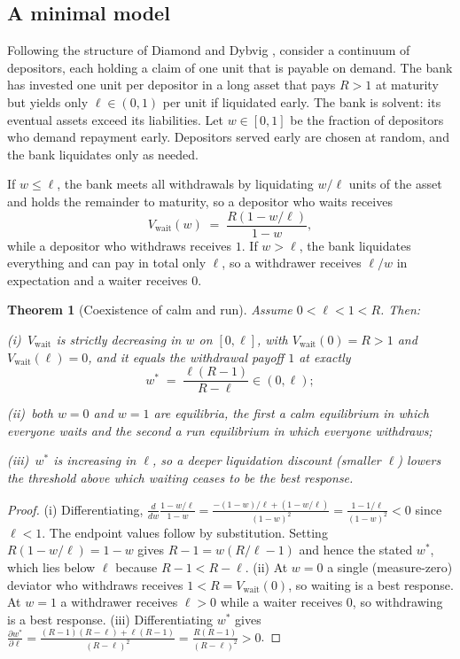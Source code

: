 \documentclass[11pt]{article}
\newtheorem{theorem}{Theorem}[section]
\theoremstyle{definition}
\theoremstyle{remark}
\begin{document}
\subsection{A minimal model}

Following the structure of Diamond and Dybvig \cite{diamond1983}, consider a continuum of depositors, each holding a claim of one unit that is payable on demand. The bank has invested one unit per depositor in a long asset that pays $R>1$ at maturity but yields only $\ell\in(0,1)$ per unit if liquidated early. The bank is solvent: its eventual assets exceed its liabilities. Let $w\in[0,1]$ be the fraction of depositors who demand repayment early. Depositors served early are chosen at random, and the bank liquidates only as needed.

If $w\le\ell$, the bank meets all withdrawals by liquidating $w/\ell$ units of the asset and holds the remainder to maturity, so a depositor who waits receives
\[
V_{\mathrm{wait}}(w)\;=\;\frac{R(1-w/\ell)}{1-w},
\]
while a depositor who withdraws receives $1$. If $w>\ell$, the bank liquidates everything and can pay in total only $\ell$, so a withdrawer receives $\ell/w$ in expectation and a waiter receives $0$.

\begin{theorem}[Coexistence of calm and run]\label{thm:run}
Assume $0<\ell<1<R$. Then:
\par\smallskip\noindent(i)~$V_{\mathrm{wait}}$ is strictly decreasing in $w$ on $[0,\ell]$, with $V_{\mathrm{wait}}(0)=R>1$ and $V_{\mathrm{wait}}(\ell)=0$, and it equals the withdrawal payoff $1$ at exactly
\[
w^\ast\;=\;\frac{\ell(R-1)}{R-\ell}\in(0,\ell);
\]
\par\smallskip\noindent(ii)~both $w=0$ and $w=1$ are equilibria, the first a calm equilibrium in which everyone waits and the second a run equilibrium in which everyone withdraws;
\par\smallskip\noindent(iii)~$w^\ast$ is increasing in $\ell$, so a deeper liquidation discount (smaller $\ell$) lowers the threshold above which waiting ceases to be the best response.
\end{theorem}

\begin{proof}
(i) Differentiating, $\frac{d}{dw}\frac{1-w/\ell}{1-w}=\frac{-(1-w)/\ell+(1-w/\ell)}{(1-w)^2}=\frac{1-1/\ell}{(1-w)^2}<0$ since $\ell<1$. The endpoint values follow by substitution. Setting $R(1-w/\ell)=1-w$ gives $R-1=w(R/\ell-1)$ and hence the stated $w^\ast$, which lies below $\ell$ because $R-1<R-\ell$. (ii) At $w=0$ a single (measure-zero) deviator who withdraws receives $1<R=V_{\mathrm{wait}}(0)$, so waiting is a best response. At $w=1$ a withdrawer receives $\ell>0$ while a waiter receives $0$, so withdrawing is a best response. (iii) Differentiating $w^\ast$ gives $\frac{\partial w^\ast}{\partial\ell}=\frac{(R-1)(R-\ell)+\ell(R-1)}{(R-\ell)^2}=\frac{R(R-1)}{(R-\ell)^2}>0$.
\end{proof}
\end{document}
